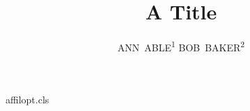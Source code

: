 \begin{filecontents*}[overwrite]{affilopt.cls}
\def\author#1{\gdef\@author{#1}}
\newcommand\affil[2][]{{\reset@font\small\unskip,\ \textsuperscript{#1}#2\endgraf}}
\def\maketitle{\par{\Large\@title\par}{\noindent\@author\par}}
\end{filecontents*}
\documentclass{affilopt}

\title{A Title}
\author{\mbox{ANN ABLE\textsuperscript{1}}  \mbox{BOB BAKER\textsuperscript{2}} }
\maketitle
Body.

